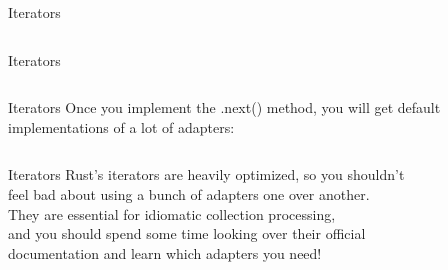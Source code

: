 \documentclass[usenames,dvipsnames,10pt,aspectratio=169]{beamer}
\begin{document}
\begin{frame}{Iterators}
	\inputminted[fontsize=\Large]{rust}{code/iterators4.rs}
\end{frame}

\begin{frame}{Iterators}
	\inputminted[fontsize=\Large]{rust}{code/iterators5.rs}
\end{frame}

\begin{frame}{Iterators}
	\large
	Once you implement the .next() method, you will get default\\
	implementations of a lot of adapters:\\
	\vspace{0.3cm}
	\inputminted[fontsize=\normalsize]{rust}{code/iterators6.rs}
	\vspace{0.3cm}
\end{frame}

\begin{frame}{Iterators}
	\large
	Rust's iterators are heavily optimized, so you shouldn't\\
	feel bad about using a bunch of adapters one over another.\\
	\vspace{0.3cm}
	They are essential for idiomatic collection processing,\\
	and you should spend some time looking over their official\\
	documentation and learn which adapters you need!
\end{frame}
 

\end{document}
